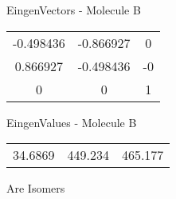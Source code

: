 \begin{multicols}{2}
\begin{center}
\vtab
 EingenVectors - Molecule B     \\
\vtab
\begin{tabular}{|c c c|}
-0.498436	 & 	-0.866927	 & 	0	 \\
0.866927	 & 	-0.498436	 & 	-0	 \\
0	 & 	0	 & 	1
\end{tabular}

\vtab
 EingenValues - Molecule B     \\
\vtab
\begin{tabular}{|c c c|}
34.6869	 & 	449.234	 & 	465.177
\end{tabular}

\end{center}
\end{multicols}
\begin{center}
\vtab
\vtab
\textcolor{NavyBlue}{\Large Are Isomers}
\end{center}
\newpage

